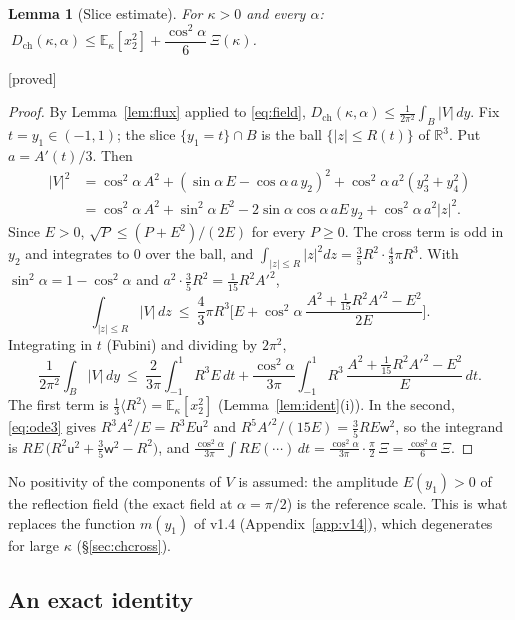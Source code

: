 \documentclass[11pt,a4paper]{article}
\newtheorem{lemma}[theorem]{Lemma}
\theoremstyle{remark}
\theoremstyle{definition}
\theoremstyle{plain}
\theoremstyle{remark}
\newcommand{\R}{\mathbb{R}}
\newcommand{\E}{\mathbb{E}}
\newcommand{\st}[1]{\textsf{[#1]}}
\newcommand{\Dch}{D_{\mathrm{ch}}}
\newcommand{\fu}{\mathsf{u}}%
\newcommand{\fw}{\mathsf{w}}
\begin{document}
\begin{lemma}[Slice estimate]\label{lem:slice}
For $\kappa>0$ and every $\alpha$: $\ \Dch(\kappa,\alpha)\le\E_\kappa[x_2^2]+\dfrac{\cos^2\!\alpha}6\,\Xi(\kappa)$.
\end{lemma}
\noindent\st{proved}
\begin{proof}
By Lemma~\ref{lem:flux} applied to \eqref{eq:field}, $\Dch(\kappa,\alpha)\le\frac1{2\pi^2}\int_B|V|\,dy$. Fix $t=y_1\in(-1,1)$; the slice
$\{y_1=t\}\cap B$ is the ball $\{|z|\le R(t)\}$ of $\R^3$. Put $a=A'(t)/3$. Then
\[
\begin{aligned}
|V|^2&=\cos^2\!\alpha\,A^2+(\sin\alpha\,E-\cos\alpha\,a\,y_2)^2+\cos^2\!\alpha\,a^2(y_3^2+y_4^2)\\
&=\cos^2\!\alpha\,A^2+\sin^2\!\alpha\,E^2-2\sin\alpha\cos\alpha\,aE\,y_2+\cos^2\!\alpha\,a^2|z|^2 .
\end{aligned}
\]
Since $E>0$, $\sqrt P\le(P+E^2)/(2E)$ for every $P\ge0$. The cross term is odd in $y_2$ and integrates to $0$ over the ball,
and $\int_{|z|\le R}|z|^2dz=\frac35R^2\cdot\frac43\pi R^3$. With $\sin^2\!\alpha=1-\cos^2\!\alpha$ and $a^2\cdot\frac35R^2=\frac1{15}R^2A'^2$,
\[
\int_{|z|\le R}|V|\,dz\ \le\ \frac43\pi R^3\Big[E+\cos^2\!\alpha\ \frac{A^2+\frac1{15}R^2A'^2-E^2}{2E}\Big].
\]
Integrating in $t$ (Fubini) and dividing by $2\pi^2$,
\[
\frac1{2\pi^2}\int_B|V|\,dy\ \le\ \frac2{3\pi}\int_{-1}^1R^3E\,dt+\frac{\cos^2\!\alpha}{3\pi}\int_{-1}^1R^3\,\frac{A^2+\frac1{15}R^2A'^2-E^2}{E}\,dt .
\]
The first term is $\frac13\langle R^2\rangle=\E_\kappa[x_2^2]$ (Lemma~\ref{lem:ident}(i)). In the second, \eqref{eq:ode3} gives
$R^3A^2/E=R^3E\fu^2$ and $R^5A'^2/(15E)=\frac35RE\fw^2$, so the integrand is $RE\,\big(R^2\fu^2+\frac35\fw^2-R^2\big)$, and
$\frac{\cos^2\alpha}{3\pi}\int RE(\cdots)\,dt=\frac{\cos^2\alpha}{3\pi}\cdot\frac\pi2\,\Xi=\frac{\cos^2\alpha}6\,\Xi$.
\end{proof}
No positivity of the components of $V$ is assumed: the amplitude $E(y_1)>0$ of the reflection field (the exact field at $\alpha=\pi/2$) is the reference scale.
This is what replaces the function $m(y_1)$ of v1.4 (Appendix~\ref{app:v14}), which degenerates for large $\kappa$ (\S\ref{sec:chcross}).

\subsection{An exact identity}\label{sec:chsos}
\end{document}
